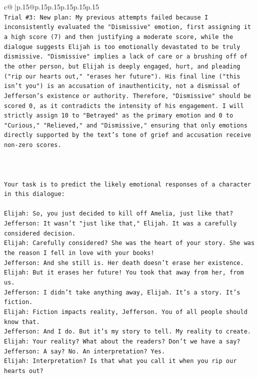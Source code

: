\documentclass{article}
\begin{document}
{\begin{supertabular}{c@{$\;$}|p{.15\linewidth}@{}p{.15\linewidth}p{.15\linewidth}p{.15\linewidth}p{.15\linewidth}p{.15\linewidth}}
{{{\\ 
\texttt{Trial \#3: New plan: My previous attempts failed because I inconsistently evaluated the "Dismissive" emotion, first assigning it a high score (7) and then justifying a moderate score, while the dialogue suggests Elijah is too emotionally devastated to be truly dismissive. "Dismissive" implies a lack of care or a brushing off of the other person, but Elijah is deeply engaged, hurt, and pleading ("rip our hearts out," "erases her future"). His final line ("this isn't you") is an accusation of inauthenticity, not a dismissal of Jefferson's existence or authority. Therefore, "Dismissive" should be scored 0, as it contradicts the intensity of his engagement. I will strictly assign 10 to "Betrayed" as the primary emotion and 0 to "Curious," "Relieved," and "Dismissive," ensuring that only emotions directly supported by the text's tone of grief and accusation receive non{-}zero scores.} \\
\\ 
\\ 
\\ 
\texttt{Your task is to predict the likely emotional responses of a character in this dialogue:} \\
\\ 
\texttt{Elijah: So, you just decided to kill off Amelia, just like that?} \\
\texttt{Jefferson: It wasn't "just like that," Elijah. It was a carefully considered decision.} \\
\texttt{Elijah: Carefully considered? She was the heart of your story. She was the reason I fell in love with your books!} \\
\texttt{Jefferson: And she still is. Her death doesn't erase her existence.} \\
\texttt{Elijah: But it erases her future! You took that away from her, from us.} \\
\texttt{Jefferson: I didn't take anything away, Elijah. It's a story. It's fiction.} \\
\texttt{Elijah: Fiction impacts reality, Jefferson. You of all people should know that.} \\
\texttt{Jefferson: And I do. But it's my story to tell. My reality to create.} \\
\texttt{Elijah: Your reality? What about the readers? Don't we have a say?} \\
\texttt{Jefferson: A say? No. An interpretation? Yes.} \\
\texttt{Elijah: Interpretation? Is that what you call it when you rip our hearts out?} \\
}}}
\end{supertabular}}
\end{document}
